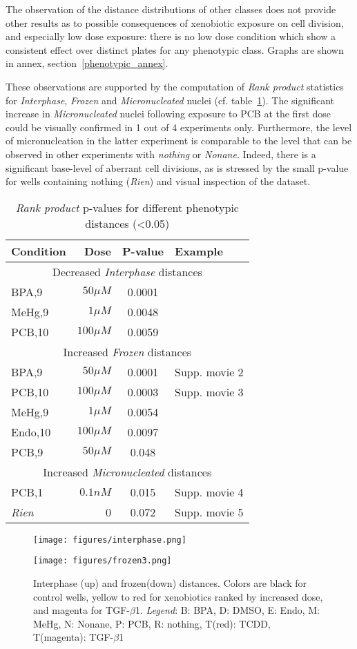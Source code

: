 The observation of the distance distributions of other classes does not provide other results as to possible consequences of xenobiotic exposure on cell division, and especially low dose exposure: there is no low dose condition which show a consistent effect over distinct plates for any phenotypic class. Graphs are shown in annex, section~\ref{phenotypic_annex}.

These observations are supported by the computation of \textit{Rank product} statistics for \textit{Interphase}, \textit{Frozen} and \textit{Micronucleated} nuclei (cf. table~\ref{dist_pheno}). The significant increase in \textit{Micronucleated} nuclei following exposure to PCB at the first dose could be visually confirmed in 1 out of 4 experiments only. Furthermore, the level of micronucleation in the latter experiment is comparable to the level that can be observed in other experiments with \textit{nothing} or \textit{Nonane}. Indeed, there is a significant base-level of aberrant cell divisions, as is stressed by the small p-value for wells containing nothing (\textit{Rien}) and visual inspection of the dataset.
\begin{table}[!ht]
\centering
\caption{\textit{Rank product} p-values for different phenotypic distances (<0.05)}
\label{dist_pheno}
\bigskip
\begin{tabular}{|l|r|c|l|}
\hline
Condition & Dose & P-value & Example\\
\hline
\multicolumn{4}{|c|}{Decreased \textit{Interphase} distances}\\
\hline
BPA,9 &$50\mu M$ &0.0001 & \\
MeHg,9 & $1\mu M$&	0.0048&\\
PCB,10 & $100\mu M$ &0.0059&\\
\hline
\multicolumn{4}{|c|}{Increased \textit{Frozen} distances}\\
\hline
BPA,9 &$50\mu M$ &0.0001 & Supp. movie 2\\
PCB,10 & $100\mu M$ &0.0003&Supp. movie 3\\%
MeHg,9 & $1\mu M$&	0.0054&\\
Endo,10 &$100\mu M$ &0.0097&\\
PCB,9 & $50\mu M$ &0.048&\\
\hline
\multicolumn{4}{|c|}{Increased \textit{Micronucleated} distances}\\
\hline
PCB,1 & $0.1 nM$ & 0.015 & Supp. movie 4 \\ %
\textit{Rien} & 0 & 0.072 & Supp. movie 5\\ %
\hline
\end{tabular}

\end{table} 		
\begin{figure}
\caption{Interphase (up) and frozen(down) distances. Colors are black for control wells, yellow to red for xenobiotics ranked by increased dose, and magenta for TGF-$\beta$1. \textit{Legend}: B: BPA, D: DMSO, E: Endo, M: MeHg, N: Nonane, P: PCB, R: nothing, T(red): TCDD, T(magenta): TGF-$\beta$1}
\centering
\label{interphase}
\centerline{
\texttt{[image: figures/interphase.png]}}
\centerline{
\texttt{[image: figures/frozen3.png]}
}
\end{figure}

